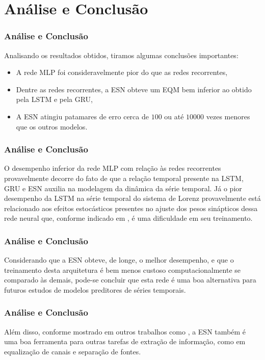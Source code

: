 \documentclass{beamer}
\begin{document}
\section{Análise e Conclusão}

\begin{frame}
\frametitle{Análise e Conclusão}

\justifying Analisando os resultados obtidos, tiramos algumas conclusões importantes:

    \begin{itemize}[<+-| alert@+>]   
    \item A rede MLP foi consideravelmente pior do que as redes recorrentes,
    \item Dentre as redes recorrentes, a ESN obteve um EQM bem inferior ao obtido pela LSTM e pela GRU, 
    \item A ESN  atingiu patamares de erro cerca de $100$ ou até $10000$ vezes menores que os outros modelos.
    \end{itemize}
\end{frame}

\begin{frame}
\frametitle{Análise e Conclusão}
\justifying O desempenho inferior da rede MLP com relação às redes recorrentes provavelmente decorre do fato de que a relação temporal presente na LSTM, GRU e ESN auxilia na modelagem da dinâmica da série temporal. Já o pior desempenho da LSTM na série temporal do sistema de Lorenz provavelmente está relacionado aos efeitos estocásticos presentes no ajuste dos pesos sinápticos dessa rede neural que, conforme indicado em \cite{doya1992bifurcations}, é uma dificuldade em seu treinamento.
\end{frame}

\begin{frame}
\frametitle{Análise e Conclusão}
\justifying Considerando que a ESN obteve, de longe, o melhor desempenho, e que o treinamento desta arquitetura é bem menos custoso computacionalmente se comparado às demais, pode-se concluir que esta rede é uma boa alternativa para futuros estudos de modelos preditores de séries temporais. 
\end{frame}

\begin{frame}
\frametitle{Análise e Conclusão}
\justifying Além disso, conforme mostrado em outros trabalhos como \cite{jaeger2004harnessing, jaeger2007echo, boccato2013novas}, a ESN também é uma boa ferramenta para outras tarefas de extração de informação, como em equalização de canais e separação de fontes. 
\end{frame}
\end{document}
